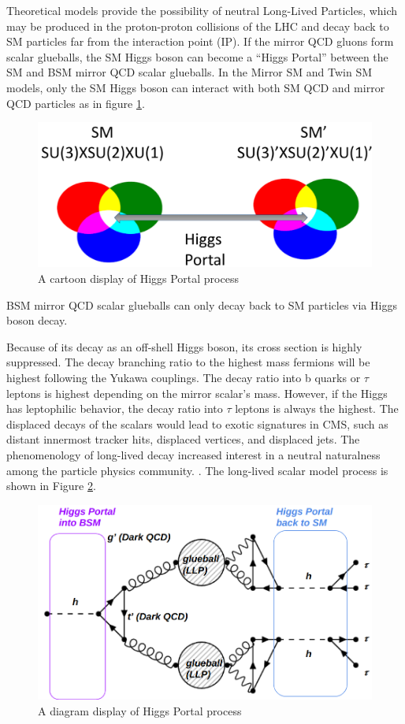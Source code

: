 Theoretical models provide the possibility of neutral Long-Lived Particles, which may be produced in the proton-proton
collisions of the LHC and decay back to SM particles far from the interaction point (IP).\cite{Craig:2015pha}
If the mirror QCD gluons form scalar glueballs, the SM Higgs boson can become a ``Higgs Portal'' between the SM and BSM mirror QCD scalar glueballs.
In the Mirror SM and Twin SM models, only the SM Higgs boson can interact with both SM QCD and mirror QCD particles as in figure \ref{fig:2HiggsPortal}.
\begin{figure}[h!]
  \caption{A cartoon display of Higgs Portal process}
  \label{fig:2HiggsPortal}
  \centering
  \includegraphics[width=0.87\linewidth]{figs/Portalcartoon.png}
\end{figure}
BSM mirror QCD scalar glueballs can only decay back to SM particles via Higgs boson decay.

Because of its decay as an off-shell Higgs boson, its cross section is highly suppressed.
The decay branching ratio to the highest mass fermions will be highest following the Yukawa couplings.
The decay ratio into b quarks or $\tau$ leptons is highest depending on the mirror scalar's mass.
However, if the Higgs has leptophilic behavior, the decay ratio into $\tau$ leptons is always the highest.
The displaced decays of the scalars would lead to exotic signatures in CMS, such as distant innermost tracker hits, displaced vertices, and displaced jets.
The phenomenology of long-lived decay increased interest in a neutral naturalness among the particle physics community. \cite{Curtin:2015fna,Csaki:2015fba}.
The long-lived scalar model process is shown in Figure \ref{fig:HiggsPortal}.



\begin{figure}[h!]
  \caption{A diagram display of Higgs Portal process}
  \label{fig:HiggsPortal}
  \centering
  \includegraphics[width=0.87\linewidth]{figs/TwinHiggs.png}
\end{figure}
